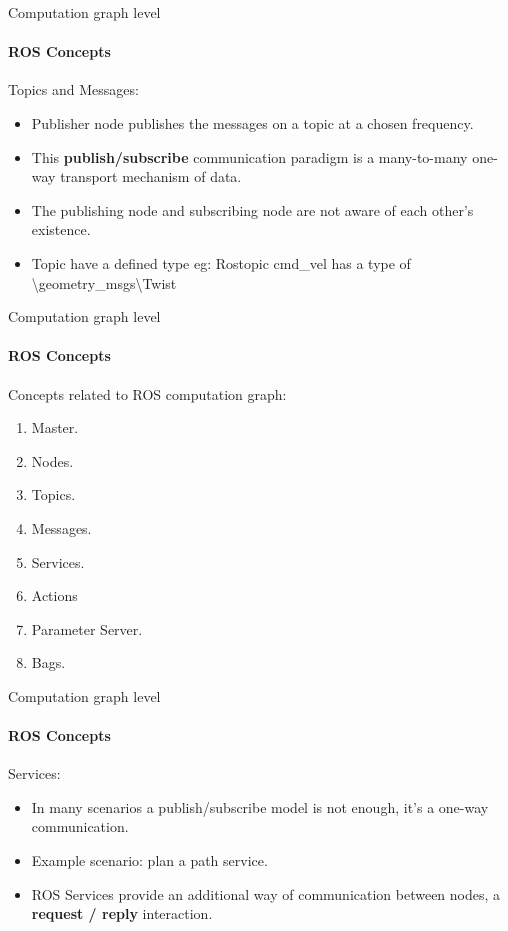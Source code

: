 \documentclass{beamer}
\begin{document}
\begin{frame}{Computation graph level}
    \framesubtitle{ROS Concepts}
    {\huge Topics and Messages:}
    \vspace{1cm}
    \begin{itemize}
        \item Publisher node publishes the messages on a topic at a chosen frequency.
        
        \item This \textbf{publish/subscribe} communication paradigm is a many-to-many one-way transport mechanism of data.
        
        \item The publishing node and subscribing node are not aware of each other's existence. 
        
        \item Topic have a defined type eg: Rostopic cmd\_vel has a type of  \textbackslash geometry\_msgs\textbackslash Twist
    \end{itemize}
\end{frame}


\begin{frame}{Computation graph level}
    \framesubtitle{ROS Concepts}
    
    Concepts related to ROS computation graph:
    
    \begin{enumerate}
        \item \textcolor{black!40}{Master.}
        \item \textcolor{black!40}{Nodes.}
        \item \textcolor{black!40}{Topics.}
        \item \textcolor{black!40}{Messages.}
        \item Services.
        \item Actions
        \item Parameter Server.
        \item Bags.
    \end{enumerate}
\end{frame}



\begin{frame}{Computation graph level}
    \framesubtitle{ROS Concepts}
    {\huge Services:}
    \vspace{0.2cm}
    \begin{itemize}
        \item In many scenarios a publish/subscribe model is not enough, it’s a one-way
        communication.
        
        \item Example scenario: plan a path service.
        
        
        \item ROS Services provide an additional way of communication between nodes, a  \textbf{request / reply}
        interaction.
    \end{itemize}  
\end{frame}
\end{document}

